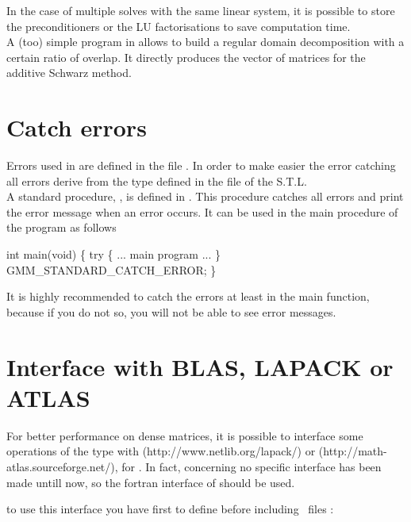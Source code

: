 \documentclass[11pt,a4paper]{article}
\begin{document}
In the case of multiple solves with the same linear system, it is possible to store the preconditioners or the LU factorisations to save computation time.\\

A (too) simple program in  allows to build a regular domain decomposition with a certain ratio of overlap. It directly produces the vector of matrices  for the additive Schwarz method.

\section{Catch errors}

Errors used in \gmm are defined in the file . In order to make easier  the error catching all errors derive from the type  defined in the file  of the S.T.L.\\[0.5cm]
A standard procedure, , is defined in . This procedure catches all errors and print the error message when an error occurs. It can be used in the main procedure of the program as follows\\[0.5cm]
\begin{cppcode}
  int main(void) \{ 
    try \{ 
      ... main program ... 
        \} 
     GMM\_STANDARD\_CATCH\_ERROR;
  \}
\end{cppcode}

It is highly recommended to catch the errors at least in the main function, because if you do not so, you will not be able to see error messages.

\section{Interface with BLAS, LAPACK or ATLAS} \label{sec:lapack}
 

For better performance on dense matrices, it is possible to interface some operations of the type  with  (http://www.netlib.org/lapack/) or  (http://math-atlas.sourceforge.net/), for . In fact, concerning  no specific interface has been made untill now, so the fortran interface of  should be used.

to use this interface you have first to define  before including \gmm \ files :
\end{document}
